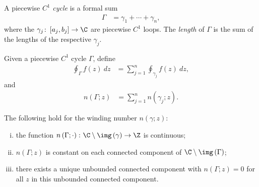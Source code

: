 \documentclass[10pt]{mypackage}
\begin{document}
\begin{definition}
  A piecewise $C^{1}$ \textit{cycle} is a formal sum
  \begin{align*}
    \Gamma &= \gamma_1 + \cdots + \gamma_n,
  \end{align*}
  where the $\gamma_j\colon \left[ a_j,b_j \right]\rightarrow \C$ are piecewise $C^{1}$ loops. The \textit{length} of $\Gamma$ is the sum of the lengths of the respective $\gamma_j$.%

  Given a piecewise $C^{1}$ cycle $\Gamma$, define
  \begin{align*}
    \oint_{\Gamma}^{} f(z)\:dz &= \sum_{j=1}^{n} \oint_{\gamma_j}^{} f(z)\:dz,
  \end{align*}
  and
  \begin{align*}
    n\left( \Gamma;z \right) &= \sum_{j=1}^{n}n\left( \gamma_j;z \right).
  \end{align*}
\end{definition}
\begin{proposition}
  The following hold for the winding number $n\left( \gamma;z \right)$:
  \begin{enumerate}[(i)]
    \item the function $n\left( \Gamma;\cdot \right)\colon \C\setminus \img\left( \gamma \right)\rightarrow \Z$ is continuous;
    \item $n\left( \Gamma;z \right)$ is constant on each connected component of $\C\setminus \img\left( \Gamma \right)$;
    \item there exists a unique unbounded connected component with $n\left( \Gamma;z \right) = 0$ for all $z$ in this unbounded connected component.
  \end{enumerate}
\end{proposition}
\end{document}
